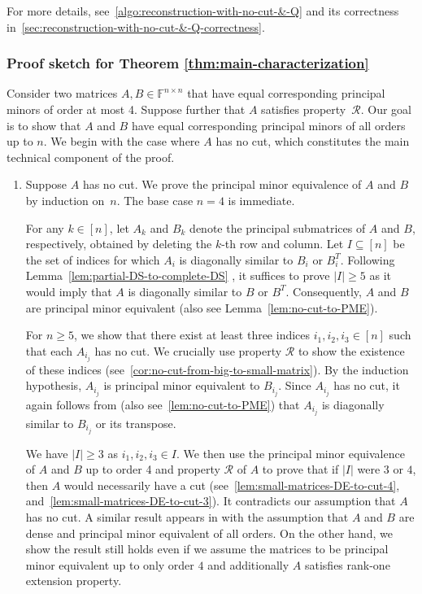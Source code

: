 \documentclass[11pt,letterpaper]{article}
\newcommand{\F}{\mathbb{F}}
\newcommand{\prop}{\mathcal{R}}
\begin{document}
{{{For more details, see~\cref{algo:reconstruction-with-no-cut-&-Q} and its correctness in~\cref{sec:reconstruction-with-no-cut-&-Q-correctness}.

\subsubsection{Proof sketch for Theorem \ref{thm:main-characterization}}
\label{sec:ideas characterization of matrices with prop Q}

Consider two matrices $A, B\in \F^{n\times n}$ that have equal corresponding principal minors of order at most 4. Suppose further that $A$ satisfies property~$\prop$. Our goal is to show that $A$ and $B$ have equal corresponding principal minors of all orders up to $n$. We begin with the case where $A$ has no cut, which constitutes the main technical component of the proof. 
\begin{enumerate}
	\item Suppose $A$ has no cut. We prove the principal minor equivalence of $A$ and $B$ by induction on~$n$. The base case $n=4$ is immediate. 
    
    For any $k \in [n]$, let $A_k$ and $B_k$ denote the principal submatrices of $A$ and $B$, respectively, obtained by deleting the $k$-th row and column. 
    Let $I \subseteq [n]$ be the set of indices for which $A_i$ is diagonally similar to $B_i$ or $B_i^T$.
    Following Lemma~\ref{lem:partial-DS-to-complete-DS} \cite[Lemma~1]{Hartfiell84}, it suffices to prove $|I| \geq 5$ as it would imply that $A$ is diagonally similar to $B$ or $B^T$. Consequently, $A$ and $B$ are principal minor equivalent \cite[Theorem 1]{Loewy86} (also see Lemma~\ref{lem:no-cut-to-PME}).
    
    For $n \geq 5$, we show that there exist at least three indices $i_1, i_2, i_3 \in [n]$ such that each $A_{i_j}$ has no cut. We crucially use property $\prop$ to show the existence of these indices (see~\cref{cor:no-cut-from-big-to-small-matrix}). By the induction hypothesis, $A_{i_j}$ is principal minor equivalent to $B_{i_j}$. Since $A_{i_j}$ has no cut, it again follows from \cite[Theorem~1]{Loewy86} (also see~\cref{lem:no-cut-to-PME}) that $A_{i_j}$ is diagonally similar to $B_{i_j}$ or its transpose. 
    
     We have $|I| \geq 3$ as $i_1, i_2, i_3 \in I$. We then use the principal minor equivalence of $A$ and $B$ up to order 4 and property $\prop$ of $A$ to prove that if $|I|$ were $3$ or $4$, then $A$ would necessarily have a cut (see~\cref{lem:small-matrices-DE-to-cut-4}, and~\cref{lem:small-matrices-DE-to-cut-3}). It contradicts our assumption that $A$ has no cut. A similar result appears in \cite[Theorem~2 and Theorem~4]{Loewy86} with the assumption that $A$ and $B$ are dense and principal minor equivalent of all orders. On the other hand, we show the result still holds even if we assume the matrices to be principal minor equivalent up to only order $4$ and additionally $A$ satisfies rank-one extension property.


\end{enumerate}}}}
\end{document}
